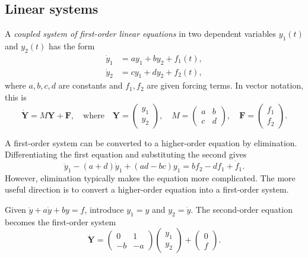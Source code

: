 \documentclass[a4paper]{article}
\begin{document}
\subsection{Linear systems}
\begin{defi}
  A \emph{coupled system of first-order linear equations} in two dependent variables $y_1(t)$ and $y_2(t)$ has the form
  \begin{align*}
    \dot y_1 &= ay_1 + by_2 + f_1(t),\\
    \dot y_2 &= cy_1 + dy_2 + f_2(t),
  \end{align*}
  where $a, b, c, d$ are constants and $f_1, f_2$ are given forcing terms. In vector notation, this is
  \[
    \dot{\mathbf{Y}} = M\mathbf{Y} + \mathbf{F}, \quad\text{where}\quad
    \mathbf{Y} = \begin{pmatrix} y_1\\y_2 \end{pmatrix},\quad
    M = \begin{pmatrix} a & b\\ c & d \end{pmatrix},\quad
    \mathbf{F} = \begin{pmatrix} f_1\\f_2 \end{pmatrix}.
  \]
\end{defi}

\begin{remark}
  A first-order system can be converted to a higher-order equation by elimination. Differentiating the first equation and substituting the second gives
  \[
    \ddot y_1 - (a + d)\dot y_1 + (ad - bc) y_1 = bf_2 - df_1 + \dot f_1.
  \]
  However, elimination typically makes the equation more complicated. The more useful direction is to convert a higher-order equation into a first-order system.
\end{remark}

\begin{remark}
  Given $\ddot{y} + a\dot{y} + by = f$, introduce $y_1 = y$ and $y_2 = \dot{y}$. The second-order equation becomes the first-order system
  \[
    \dot{\mathbf{Y}} =
    \begin{pmatrix}
      0 & 1\\
      -b & -a
    \end{pmatrix}
    \begin{pmatrix}
      y_1\\y_2
    \end{pmatrix}
    +
    \begin{pmatrix}
      0 \\ f
    \end{pmatrix}.
  \]
\end{remark}
\end{document}
